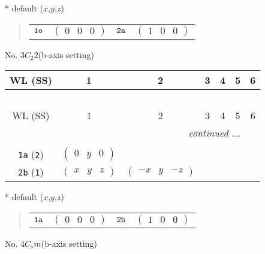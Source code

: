 \documentclass[fleqn,9pt,landscape]{jsarticle}
\begin{document}
* default ($x$,$y$,$z$)
\begin{quote}
\begin{tabular}{cccc}
$ {\tt 1o} $ & $ \begin{pmatrix} 0 & 0 & 0 \end{pmatrix} $ & $ {\tt 2a} $ & $ \begin{pmatrix} 1 & 0 & 0 \end{pmatrix} $
\end{tabular}
\end{quote}
\newpage
No. 3\quad$C_{2}$\quad$2$\quad(b-axis setting)\quad[ monoclinic ]
\begin{center}
\renewcommand{\arraystretch}{1.2}
\begin{longtable}{ccccccc}
 \hline \hline
WL (SS) & 1 & 2 & 3 & 4 & 5 & 6 \\ \hline \endfirsthead

\multicolumn{6}{l}{\tablename\ \thetable{}} \\
 \hline \hline
WL (SS) & 1 & 2 & 3 & 4 & 5 & 6 \\ \hline \endhead

 \hline \hline
\multicolumn{6}{r}{\footnotesize\it continued ...} \\ \endfoot

 \hline \hline
\multicolumn{6}{r}{} \\ \endlastfoot

{\tt 1a} ({\tt 2}) & $ \begin{pmatrix} 0 & y & 0 \end{pmatrix} $ & $  $ \\ \hline
{\tt 2b} ({\tt 1}) & $ \begin{pmatrix} x & y & z \end{pmatrix} $ & $ \begin{pmatrix} - x & y & - z \end{pmatrix} $ \\
\end{longtable}
\end{center}
* default ($x$,$y$,$z$)
\begin{quote}
\begin{tabular}{cccc}
$ {\tt 1a} $ & $ \begin{pmatrix} 0 & 0 & 0 \end{pmatrix} $ & $ {\tt 2b} $ & $ \begin{pmatrix} 1 & 0 & 0 \end{pmatrix} $
\end{tabular}
\end{quote}
\newpage
No. 4\quad$C_{s}$\quad$m$\quad(b-axis setting)\quad[ monoclinic ]
\end{document}
